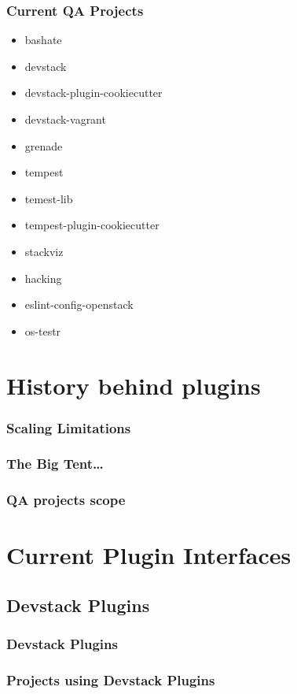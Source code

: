\documentclass[aspectratio=169,11pt,hyperref={colorlinks=true}]{beamer}
\begin{document}
\begin{frame}
    \frametitle{Current QA Projects}
    \begin{itemize}
    \item{bashate}
    \item{devstack}
    \item{devstack-plugin-cookiecutter}
    \item{devstack-vagrant}
    \item{grenade}
    \item{tempest}
    \item{temest-lib}
    \item{tempest-plugin-cookiecutter}
    \item{stackviz}
    \item{hacking}
    \item{eslint-config-openstack}
    \item{os-testr}
    \end{itemize}
\end{frame}

\section{History behind plugins}
\begin{frame}
\frametitle{Scaling Limitations}
\end{frame}

\begin{frame}
    \frametitle{The Big Tent\ldots}
\end{frame}

\begin{frame}
    \frametitle{QA projects scope}

\end{frame}

\section{Current Plugin Interfaces}
\subsection{Devstack Plugins}
\begin{frame}
\frametitle{Devstack Plugins}
\end{frame}

\begin{frame}
    \frametitle{Projects using Devstack Plugins}
\end{frame}
\end{document}
